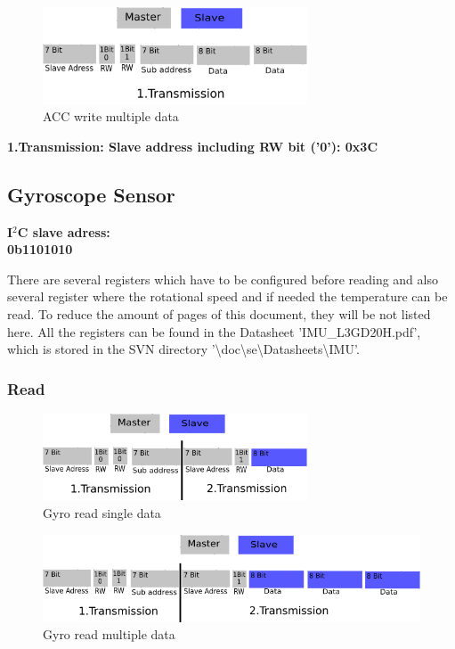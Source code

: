 \begin{figure}[H]
	\centering\includegraphics[width=0.7\textwidth]{fig/ACC_write_multiple}
	\caption{ACC write multiple data}
	\label{fig:ACC4}
\end{figure}

\textbf{1.Transmission: Slave address including RW bit ('0'): 0x3C}


\subsection{Gyroscope Sensor}
\label{subsec:Gyro}

\textbf{I$^2$C slave adress:\\
0b1101010}

There are several registers which have to be configured before reading and also several register where the rotational speed and if needed the temperature can be read. To reduce the amount of pages of this document, they will be not listed here. All the registers can be found in the Datasheet 'IMU\_L3GD20H.pdf', which is stored in the SVN directory '\textbackslash{}doc\textbackslash{}se\textbackslash{}Datasheets\textbackslash{}IMU'.

\subsubsection{Read}
\label{subsubsec:Gyroread}

\begin{figure}[H]
	\centering\includegraphics[width=0.7\textwidth]{fig/ACC_read_single}
	\caption{Gyro read single data}
	\label{fig:Gyro1}
\end{figure}

\begin{figure}[H]
	\centering\includegraphics[width=1\textwidth]{fig/ACC_read_multiple}
	\caption{Gyro read multiple data}
	\label{fig:Gyro2}
\end{figure}

